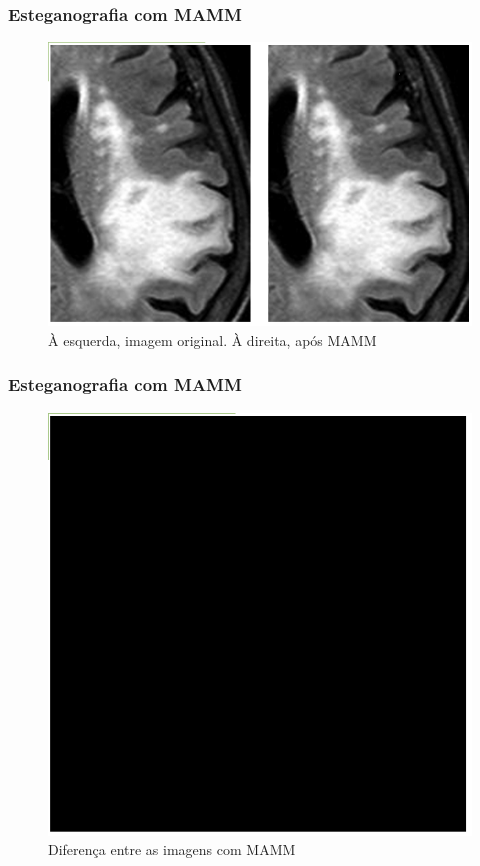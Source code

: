 \documentclass{beamer}
\begin{document}
\begin{frame}
\frametitle{Esteganografia com MAMM}
\begin{figure}
\includegraphics[scale=.2]{MAMM.png} 
\caption{À esquerda, imagem original. À direita, após MAMM}

\end{figure}
\end{frame}

\begin{frame}
\frametitle{Esteganografia com MAMM}
\begin{figure}
\includegraphics[scale=.2]{MAMMdiff.png} 
\caption{Diferença entre as imagens com MAMM}

\end{figure}
\end{frame}
\end{document}

